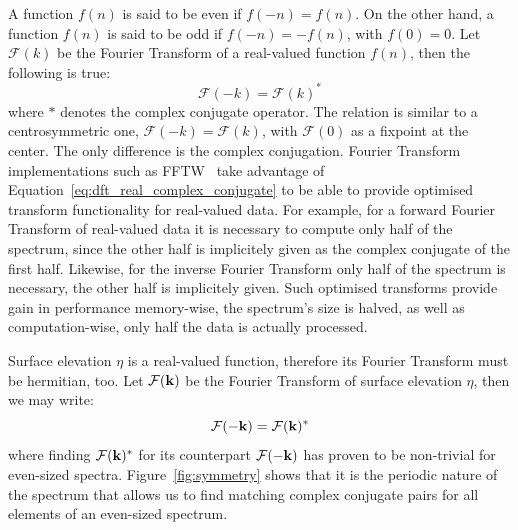 A function $f(n)$ is said to be even if
$f(-n) = f(n)$. On the other hand, a function $f(n)$ is said to be odd if $f(-n) = -f(n)$,
with $f(0) = 0$. Let $\mathcal{F}(k)$ be the Fourier Transform of a real-valued function $f(n)$, then
the following is true:
\begin{equation}
\label{eq:dft_real_complex_conjugate}
 \mathcal{F}(-k) = \mathcal{F}(k)^*
\end{equation}
where $*$ denotes the complex conjugate operator. The relation is similar to a centrosymmetric one,
$\mathcal{F}(-k) = \mathcal{F}(k)$, with $\mathcal{F}(0)$ as a fixpoint at the center. The only
difference is the complex conjugation. Fourier Transform implementations such as FFTW~\citep{FFTW05}
take advantage of Equation~\ref{eq:dft_real_complex_conjugate} to be able to provide optimised
transform functionality for real-valued data. For example, for a forward Fourier Transform of real-valued data it is
necessary to compute only half of the spectrum, since the other half is implicitely given as the
complex conjugate of the first half. Likewise, for the inverse Fourier Transform only half of the
spectrum is necessary, the other half is implicitely given. Such optimised transforms provide
gain in performance memory-wise, the spectrum's size is halved, as well as computation-wise, only
half the data is actually processed.

Surface elevation $\eta$ is a real-valued function, therefore its Fourier Transform must be hermitian,
too. Let $\mathcal{F}(\mathbf{k})$ be the Fourier Transform of surface elevation $\eta$, then
we may write:
\begin{equation}
\label{eq:h0_k_complex_conjugate}
 \mathcal{F}(-\mathbf{k}) = \mathcal{F}(\mathbf{k})^*
\end{equation}
where finding $\mathcal{F}(\mathbf{k})^*$ for its counterpart $\mathcal{F}(-\mathbf{k})$
has proven to be non-trivial for even-sized spectra.
Figure~\ref{fig:symmetry} shows that it is the periodic nature of the spectrum that
allows us to find matching complex conjugate pairs for all elements of an even-sized spectrum.



